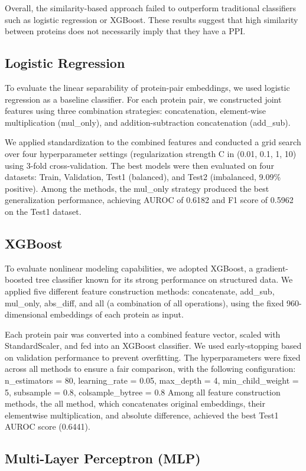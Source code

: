 \documentclass{article}
\begin{document}
Overall, the similarity-based approach failed to outperform traditional classifiers such as logistic regression or XGBoost. These results suggest that high similarity between proteins does not necessarily imply that they have a PPI.
	
	\subsection{Logistic Regression}
To evaluate the linear separability of protein-pair embeddings, we used logistic regression as a baseline classifier. For each protein pair, we constructed joint features using three combination strategies: concatenation, element-wise multiplication (mul\_only), and addition-subtraction concatenation (add\_sub).

We applied standardization to the combined features and conducted a grid search over four hyperparameter settings (regularization strength C in ({0.01, 0.1, 1, 10}) using 3-fold cross-validation. The best models were then evaluated on four datasets: Train, Validation, Test1 (balanced), and Test2 (imbalanced, 9.09\% positive). Among the methods, the mul\_only strategy produced the best generalization performance, achieving AUROC of 0.6182 and F1 score of 0.5962 on the Test1 dataset.
	\subsection{XGBoost}
To evaluate nonlinear modeling capabilities, we adopted XGBoost, a gradient-boosted tree classifier known for its strong performance on structured data. We applied five different feature construction methods: concatenate, add\_sub, mul\_only, abs\_diff, and all (a combination of all operations), using the fixed 960-dimensional embeddings of each protein as input.

Each protein pair was converted into a combined feature vector, scaled with StandardScaler, and fed into an XGBoost classifier. We used early-stopping based on validation performance to prevent overfitting. The hyperparameters were fixed across all methods to ensure a fair comparison, with the following configuration:
n\_estimators = 80,
learning\_rate = 0.05,
max\_depth = 4,
min\_child\_weight = 5,
subsample = 0.8,
colsample\_bytree = 0.8
Among all feature construction methods, the all method, which concatenates original embeddings, their elementwise multiplication, and absolute difference, achieved the best Test1 AUROC score (0.6441).
	\subsection{Multi-Layer Perceptron (MLP)}
    
\end{document}
